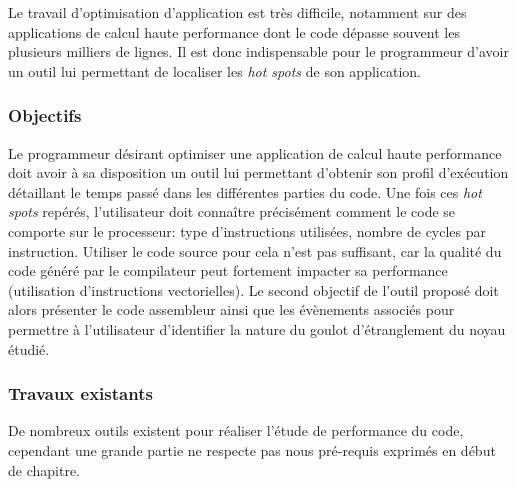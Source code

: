         Le travail d'optimisation d'application est très difficile, notamment sur des applications de calcul haute performance dont le code dépasse souvent les plusieurs milliers de lignes. Il est donc indispensable pour le programmeur d'avoir un outil lui permettant de localiser les \textit{hot spots} de son application.
        

    
    \subsubsection{Objectifs}

        Le programmeur désirant optimiser une application de calcul haute performance doit avoir à sa disposition un outil lui permettant d'obtenir son profil d'exécution détaillant le temps passé dans les différentes parties du code. Une fois ces \textit{hot spots} repérés, l'utilisateur doit connaître précisément comment le code se comporte sur le processeur: type d'instructions utilisées, nombre de cycles par instruction. Utiliser le code source pour cela n'est pas suffisant, car la qualité du code généré par le compilateur peut fortement impacter sa performance (utilisation d'instructions vectorielles). Le second objectif de l'outil proposé doit alors présenter le code assembleur ainsi que les évènements associés pour permettre à l'utilisateur d'identifier la nature du goulot d'étranglement du noyau étudié.
        
        



    \subsubsection{Travaux existants}
        
        De nombreux outils existent pour réaliser l'étude de performance du code, cependant une grande partie ne respecte pas nous pré-requis exprimés en début de chapitre. 
        
